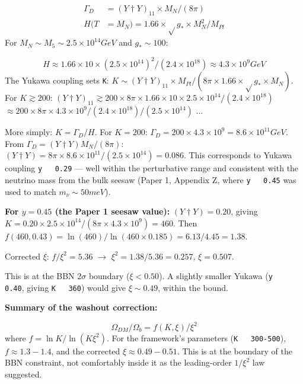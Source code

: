 \documentclass[aps,prd,preprint,superscriptaddress,longbibliography]{revtex4-2}
\begin{document}
\begin{align}
    \Gamma_D &= (Y\dagger Y)_{11} \times M_N / (8\pi) \\
    H(T &= M_N) = 1.66 \times \sqrt{}g_* \times M_N^{2} / M_{Pl}
\end{align}
For $M_N \sim  M_{5} \sim  2.5 \times 10^{14} GeV$ and $g_* \sim  100$:


\begin{equation}
    H \approx 1.66 \times 10 \times (2.5 \times 10^{14})^{2} / (2.4 \times 10^{18}) \approx 4.3 \times 10^{9} GeV
\end{equation}
The Yukawa coupling sets \texttt{K}: $K \sim  (Y\dagger Y)_{11} \times M_{Pl} / (8\pi \times 1.66 \times \sqrt{}g_* \times M_N)$. For $K \gtrsim 200$: $(Y\dagger Y)_{11} \gtrsim 200 \times 8\pi \times 1.66 \times 10 \times 2.5 \times 10^{14} / (2.4 \times 10^{18})$ $\approx 200 \times 8\pi \times 4.3 \times 10^{9} / (2.4 \times 10^{18}) / (2.5\times10^{14})$ ...

More simply: $K = \Gamma_D/H$. For $K = 200$: $\Gamma_D = 200 \times 4.3 \times 10^{9} = 8.6 \times 10^{11} GeV$. From $\Gamma_D = (Y\dagger Y)M_N/(8\pi)$: $(Y\dagger Y) = 8\pi \times 8.6 \times 10^{11} / (2.5 \times 10^{14}) = 0.086$. This corresponds to Yukawa coupling \texttt{y ~ 0.29} --- well within the perturbative range and consistent with the neutrino mass from the bulk seesaw (Paper 1, Appendix Z, where \texttt{y ~ 0.45} was used to match $m_\nu \sim  50 meV$).

\textbf{For $y = 0.45$ (the Paper 1 seesaw value):} $(Y\dagger Y) = 0.20$, giving $K = 0.20 \times 2.5 \times 10^{14} / (8\pi \times 4.3 \times 10^{9}) = 460$. Then $f(460, 0.43) = \ln(460)/\ln(460 \times 0.185) = 6.13/4.45 = 1.38$.

Corrected $\xi$: $f/\xi^{2} = 5.36$ $\to$ $\xi^{2} = 1.38/5.36 = 0.257$, $\xi = 0.507$.

This is at the BBN $2\sigma$ boundary ($\xi < 0.50$). A slightly smaller Yukawa (\texttt{y ~ 0.40}, giving \texttt{K ~ 360}) would give $\xi \sim  0.49$, within the bound.

\textbf{Summary of the washout correction:}


\begin{equation}
    \Omega_{DM} / \Omega_b = f(K, \xi) / \xi^{2}
\end{equation}
where $f = \ln K / \ln(K\xi^{2})$. For the framework's parameters (\texttt{K ~ 300-500}), $f \approx 1.3-1.4$, and the corrected $\xi \approx 0.49-0.51$. This is at the boundary of the BBN constraint, not comfortably inside it as the leading-order $1/\xi^{2}$ law suggested.
\end{document}
